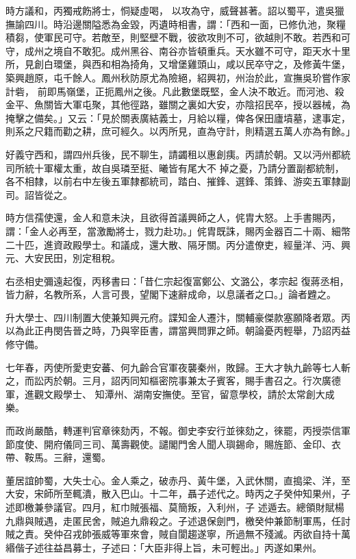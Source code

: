 \begin{pinyinscope}
 時方議和，丙獨戒飭將士，恫疑虛喝，
 以攻為守，威聲甚著。詔以蜀平，遣吳獵撫諭四川。時沿邊關隘悉為金毀，丙遺時相書，謂：「西和一面，已修仇池，聚糧積芻，使軍民可守。若敵至，則堅壁不戰，彼欲攻則不可，欲越則不敢。若西和可守，成州之境自不敢犯。成州黑谷、南谷亦皆頓重兵。天水雖不可守，距天水十里所，見創白環堡，與西和相為掎角，又增堡雞頭山，咸以民卒守之，及修黃牛堡，築興趙原，屯千餘人。鳳州秋防原尤為險絕，紹興初，州治於此，宣撫吳玠嘗作家計砦，
 前即馬嶺堡，正扼鳳州之後。凡此數堡既堅，金人決不敢近。而河池、殺金平、魚關皆大軍屯聚，其他徑路，雖關之裏如大安，亦陰招民卒，授以器械，為掩擊之備矣。」又云：「見於關表廣結義士，月給以糧，俾各保田廬墳墓，逮事定，則系之尺籍而勸之耕，庶可經久。以丙所見，直為守計，則精選五萬人亦為有餘。」



 好義守西和，謂四州兵後，民不聊生，請蠲租以惠創痍。丙請於朝。又以沔州都統司所統十軍權太重，故自吳璘至挺、曦皆有尾大不
 掉之憂，乃請分置副都統制，各不相隸，以前右中左後五軍隸都統司，踏白、摧鋒、選鋒、策鋒、游奕五軍隸副司。詔皆從之。



 時方信孺使還，金人和意未決，且欲得首議興師之人，侂胄大怒。上手書賜丙，謂：「金人必再至，當激勵將士，戮力赴功。」侂胄既誅，賜丙金器百二十兩、細幣二十匹，進資政殿學士。和議成，還大散、隔牙關。丙分遣僚吏，經量洋、沔、興元、大安民田，別定租稅。



 右丞相史彌遠起復，丙移書曰：「昔仁宗起復富鄭公、文潞公，孝宗起
 復蔣丞相，皆力辭，名教所系，人言可畏，望閣下速辭成命，以息議者之口。」論者韙之。



 升大學士、四川制置大使兼知興元府。諜知金人遷汴，關輔豪傑款塞願降者眾。丙以為此正冉閔告晉之時，乃與宰臣書，謂當興問罪之師。朝論憂丙輕舉，乃詔丙益修守備。



 七年春，丙使所愛吏安蕃、何九齡合官軍夜襲秦州，敗歸。王大才執九齡等七人斬之，而訟丙於朝。三月，詔丙同知樞密院事兼太子賓客，賜手書召之。行次廣德軍，進觀文殿學士、
 知潭州、湖南安撫使。至官，留意學校，請於太常創大成樂。



 而政尚嚴酷，轉運判官章徠劾丙，不報。御史李安行並徠劾之，徠罷，丙授崇信軍節度使、開府儀同三司、萬壽觀使。譴閣門舍人聞人璵錫命，賜旌節、金印、衣帶、鞍馬。三辭，還蜀。



 董居誼帥蜀，大失士心。金人乘之，破赤丹、黃牛堡，入武休關，直搗梁、洋，至大安，宋師所至輒潰，散入巴山。十二年，聶子述代之。時丙之子癸仲知果州，子述即檄兼參議官。四月，紅巾賊張福、莫簡叛，入利州，子
 述遁去。總領財賦楊九鼎與賊遇，走匿民舍，賊追九鼎殺之。子述退保劍門，檄癸仲兼節制軍馬，任討賊之責。癸仲召戎帥張威等軍來會，賊自閬趨遂寧，所過無不殘滅。丙欲自持十萬緡偕子述往益昌募士，子述曰：「大臣非得上旨，未可輕出。」丙遂如果州。




\end{pinyinscope}
